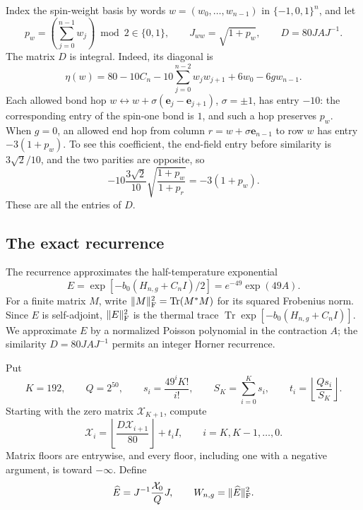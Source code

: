 \documentclass[11pt]{article}
\theoremstyle{remark}
\numberwithin{equation}{section}
\begin{document}
Index the spin-weight basis by words $w=(w_0,\ldots,w_{n-1})$ in
$\{-1,0,1\}^n$, and let
\[
 p_w=\left(\sum_{j=0}^{n-1}w_j\right)\bmod2\in\{0,1\},
 \qquad J_{ww}=\sqrt{1+p_w},\qquad D=80JAJ^{-1}.
\]
The matrix $D$ is integral. Indeed, its diagonal is
\begin{equation}\label{appth:diagonal}
 \eta(w)=80-10C_n-10\sum_{j=0}^{n-2}w_jw_{j+1}
                  +6w_0-6g w_{n-1}.
\end{equation}
Each allowed bond hop $w\leftrightarrow
w+\sigma(\mathbf e_j-\mathbf e_{j+1})$, $\sigma=\pm1$, has entry $-10$:
the corresponding entry of the spin-one bond is $1$, and such a hop
preserves $p_w$. When $g=0$, an allowed end hop from column
$r=w+\sigma\mathbf e_{n-1}$ to row $w$ has entry $-3(1+p_w)$.
To see this coefficient, the end-field entry before similarity
is $3\sqrt2/10$, and the two parities are opposite, so
\[
 -10\frac{3\sqrt2}{10}
       \sqrt{\frac{1+p_w}{1+p_r}}=-3(1+p_w).
\]
These are all the entries of $D$.

\subsection{The exact recurrence}

The recurrence approximates the half-temperature exponential
\[
 E=\exp[-b_0(H_{n,g}+C_n I)/2]=e^{-49}\exp(49A).
\]
For a finite matrix $M$, write $\|M\|_{\rm F}^2=\operatorname{Tr}(M^*M)$ for
its squared Frobenius norm. Since $E$ is self-adjoint, $\|E\|_{\rm F}^2$
is the thermal trace $\operatorname{Tr}\exp[-b_0(H_{n,g}+C_n I)]$. We approximate
$E$ by a normalized Poisson polynomial in the contraction $A$;
the similarity $D=80JAJ^{-1}$ permits an integer Horner recurrence.

Put
\begin{equation}\label{appth:coefficients}
 K=192,\qquad Q=2^{50},\qquad
 s_i=\frac{49^iK!}{i!},\qquad S_K=\sum_{i=0}^Ks_i,
 \qquad t_i=\left\lfloor\frac{Qs_i}{S_K}\right\rfloor.
\end{equation}
Starting with the zero matrix $\mathcal X_{K+1}$, compute
\begin{equation}\label{appth:horner}
 \mathcal X_i=
       \left\lfloor\frac{D\mathcal X_{i+1}}{80}\right\rfloor+t_i I,
 \qquad i=K,K-1,\ldots,0.
\end{equation}
Matrix floors are entrywise, and every floor, including one with a negative
argument, is toward $-\infty$. Define
\begin{equation}\label{appth:W}
 \widehat E=J^{-1}\frac{\mathcal X_0}{Q}J,
 \qquad W_{n,g}=\|\widehat E\|_{\rm F}^2.
\end{equation}
\end{document}
